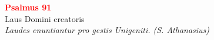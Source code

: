 


\def\greinitialformat#1{%
{\fontsize{39}{39}\selectfont #1}%
}




\vspace{0.3cm}
\begin{center}
 \textcolor{red}{\large \bf Psalmus 91}\\
Laus Domini creatoris\\
\textit{\small Laudes enuntiantur pro gestis Unigeniti. (S. Athanasius)}
\end{center}

